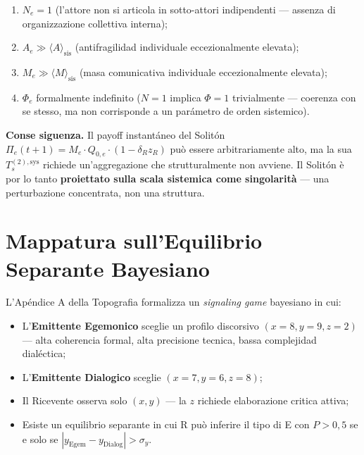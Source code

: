 \begin{enumerate}
\def\labelenumi{\arabic{enumi}.}
\tightlist
\item
  \(N_e = 1\) (l'attore non si articola in sotto-attori indipendenti ---
  assenza di organizzazione collettiva interna);
\item
  \(A_e \gg \langle A \rangle_{\text{sis}}\) (antifragilidad individuale
  eccezionalmente elevata);
\item
  \(M_e \gg \langle M \rangle_{\text{sis}}\) (masa comunicativa
  individuale eccezionalmente elevata);
\item
  \(\Phi_e\) formalmente indefinito (\(N=1\) implica \(\Phi = 1\)
  trivialmente --- coerenza con se stesso, ma non corrisponde a un
  parámetro de orden sistemico).
\end{enumerate}

\Proved{} \textbf{Conse siguenza.} Il payoff instantáneo del Solitón
\(\Pi_e(t+1) = M_e \cdot Q_{0,e} \cdot (1 - \delta_R z_R)\) può essere
arbitrariamente alto, ma la sua \(T_s^{(2),\text{sys}}\) richiede
un'aggregazione che strutturalmente non avviene. Il Solitón è por lo tanto
\textbf{proiettato sulla scala sistemica come singolarità} --- una
perturbazione concentrata, non una struttura.



\section{Mappatura sull'Equilibrio Separante
Bayesiano}\label{mappatura-sullequilibrio-separante-bayesiano}

L'Apéndice A della Topografia formalizza un \emph{signaling game}
bayesiano in cui:

\begin{itemize}
\tightlist
\item
  L'\textbf{Emittente Egemonico} sceglie un profilo discorsivo
  \((x = 8, y = 9, z = 2)\) --- alta coherencia formal, alta precisione
  tecnica, bassa complejidad dialéctica;
\item
  L'\textbf{Emittente Dialogico} sceglie \((x = 7, y = 6, z = 8)\);
\item
  Il Ricevente osserva solo \((x, y)\) --- la \(z\) richiede
  elaborazione critica attiva;
\item
  Esiste un equilibrio separante in cui R può inferire il tipo di E con
  \(P > 0{,}5\) se e solo se
  \(|y_{\text{Egem}} - y_{\text{Dialog}}| > \sigma_y\).
\end{itemize}

